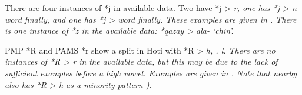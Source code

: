 \newpage
There are four instances of *j in available data.
Two have *j > \it{r},
one has *j > \it{n} word finally,
and one has *j > {\0} word finally.
These examples are given in .
There is one instance of *z in the available data: *qazay > \it{ala-} ‘chin’.


PMP *R
and PAMS *r show a split in Hoti with *R > \it{h,} {\0}\it{, l}.
There are no instances of *R > \it{r} in the available data,
but this may be due to the lack of sufficient examples before a high vowel.
Examples are given in .
Note that nearby  also has *R > \it{h} as a minority
pattern ).

